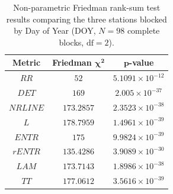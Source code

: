 \vspace{-3pt}
\begin{table}[H]
\caption{Non-parametric Friedman rank-sum test results comparing the three stations blocked by Day of Year (DOY, $N = 98$ complete blocks, $\text{df} = 2$).\label{tab:friedman_results}}
\begin{tabularx}{\textwidth}{CCC}
\toprule
\textbf{Metric} & \textbf{Friedman} $\boldsymbol{\chi^2}$ & $\boldsymbol{p}$\textbf{-value} \\
\midrule
$RR$ & $52$ & $5.1091 \times 10^{-12}$ \\
$DET$ & $169$ & $2.005 \times 10^{-37}$ \\
$NRLINE$ & $173.2857$ & $2.3523 \times 10^{-38}$ \\
$L$ & $178.7959$ & $1.4961 \times 10^{-39}$ \\
$ENTR$ & $175$ & $9.9824 \times 10^{-39}$ \\
$rENTR$ & $135.4286$ & $3.9089 \times 10^{-30}$ \\
$LAM$ & $173.7143$ & $1.8986 \times 10^{-38}$ \\
$TT$ & $177.0612$ & $3.5616 \times 10^{-39}$ \\
\bottomrule
\end{tabularx}
\end{table}
\vspace{-3pt}
